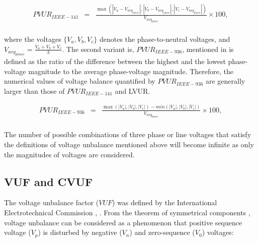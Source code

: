 	\begin{equation}
        \begin{array}{rcl}
            PVUR_{IEEE-141}&=&\frac{\max\left( |V_{a}-V_{avg_{phase}}|,|V_{b}-V_{avg_{phase}}|,|V_{c}-V_{avg_{phase}}| \right)}{V_{avg_{phase}}}\times100,\\
        \end{array}
        \label{BASICUNB:equ:PVUR-141}
    \end{equation}

where the voltages $\{V_{a},V_{b},V_{c}\}$ denotes the phase-to-neutral voltages, and $V_{avg_{phase}}=\frac{V_{a}+V_{b}+V_{c}}{3}$.
The second variant is, $PVUR_{IEEE-936}$, mentioned in \cite{IEEE_936_29053} is defined as the ratio of the difference between the highest and the lowest phase-voltage magnitude to the average phase-voltage magnitude. Therefore, the numerical values of voltage balance quantified by $PVUR_{IEEE-936}$ are generally larger than those of $PVUR_{IEEE-141}$ and LVUR.

\begin{equation}
        \begin{array}{rcl}
            PVUR_{IEEE-936}&=&\frac{\max\left( |V_a|,|V_b|,|V_c| \right)-min\left( |V_a|,|V_b|,|V_c| \right)}{V_{avg_{phase}}}\times100,\\					
        \end{array}
        \label{BASICUNB:equ:PVUR-936}
    \end{equation}
		
The number of possible combinations of three phase or line voltages that satisfy the definitions of voltage unbalance mentioned above will become infinite as only the magnitudes of voltages are considered.	
		
	
	\subsection{VUF and CVUF}\label{BASICUNB:sec:VUFCVUF}
	
	The voltage unbalance factor ($VUF$) was defined by the International Electrotechnical Commission \cite{pillay2001definitions}, \cite{dugan1996electrical}. From the theorem of symmetrical components \cite{fortescue1918method}, voltage unbalance can be considered as a phenomenon that positive sequence voltage  ($V_p$) is disturbed by negative  ($V_n$) and zero-sequence ($V_0$) voltages:
	
